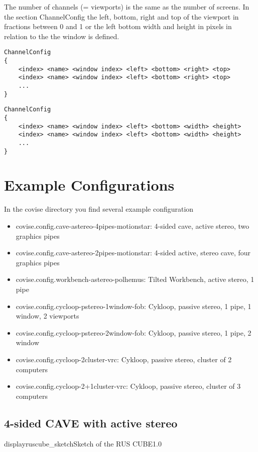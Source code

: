 The number of channels (= viewports) is the same as the number of screens.
In the section ChannelConfig the left, bottom, right and top of the 
viewport in fractions between 0 and 1 or the left bottom width and height
in pixels in relation to the the window is defined. 

\small \begin{verbatim}
ChannelConfig
{
    <index> <name> <window index> <left> <bottom> <right> <top>
    <index> <name> <window index> <left> <bottom> <right> <top>
    ...
}
\end{verbatim} \normalsize
\small \begin{verbatim}
ChannelConfig
{
    <index> <name> <window index> <left> <bottom> <width> <height>
    <index> <name> <window index> <left> <bottom> <width> <height>
    ...
}
\end{verbatim} \normalsize




\newpage
\section{Example Configurations}
\label{label_section_examples}

In the covise directory you find several example configuration
\begin{itemize}
\item covise.config.cave-astereo-4pipes-motionstar: 4-sided cave, active stereo, two graphics pipes
\item covise.config.cave-astereo-2pipes-motionstar:  4-sided active, stereo cave, four graphics pipes
\item covise.config.workbench-astereo-polhemus: Tilted Workbench, active stereo, 1 pipe
\item covise.config.cycloop-pstereo-1window-fob: Cykloop, passive stereo, 1 pipe, 1 window, 2 viewports
\item covise.config.cycloop-pstereo-2window-fob: Cykloop, passive stereo, 1 pipe, 2 window
\item covise.config.cycloop-2cluster-vrc: Cykloop, passive stereo, cluster of 2 computers
\item covise.config.cycloop-2+1cluster-vrc: Cykloop, passive stereo, cluster of 3 computers
 
\end{itemize}

\subsection{4-sided CAVE with active stereo}
\begin{covimg}{display}{ruscube_sketch}{Sketch of the RUS CUBE}{1.0}\end{covimg}


